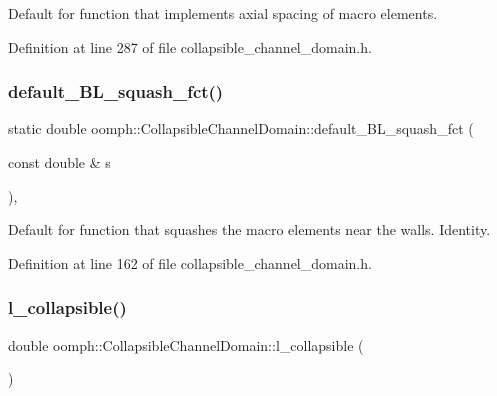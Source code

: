 Default for function that implements axial spacing of macro elements. 



Definition at line 287 of file collapsible\+\_\+channel\+\_\+domain.\+h.

\mbox{\label{classoomph_1_1CollapsibleChannelDomain_a4222184a903df3efdd93cc306bac4414}} 
\subsubsection{\texorpdfstring{default\+\_\+\+B\+L\+\_\+squash\+\_\+fct()}{default\_BL\_squash\_fct()}}
{\footnotesize\ttfamily static double oomph\+::\+Collapsible\+Channel\+Domain\+::default\+\_\+\+B\+L\+\_\+squash\+\_\+fct (\begin{DoxyParamCaption}\item[{const double \&}]{s }\end{DoxyParamCaption})\hspace{0.3cm}{\ttfamily [inline]}, {\ttfamily [static]}}



Default for function that squashes the macro elements near the walls. Identity. 



Definition at line 162 of file collapsible\+\_\+channel\+\_\+domain.\+h.

\mbox{\label{classoomph_1_1CollapsibleChannelDomain_a0b38028581a27e6b34529ba2c3fa1af2}} 
\subsubsection{\texorpdfstring{l\+\_\+collapsible()}{l\_collapsible()}}
{\footnotesize\ttfamily double oomph\+::\+Collapsible\+Channel\+Domain\+::l\+\_\+collapsible (\begin{DoxyParamCaption}{ }\end{DoxyParamCaption})\hspace{0.3cm}{\ttfamily [inline]}}



